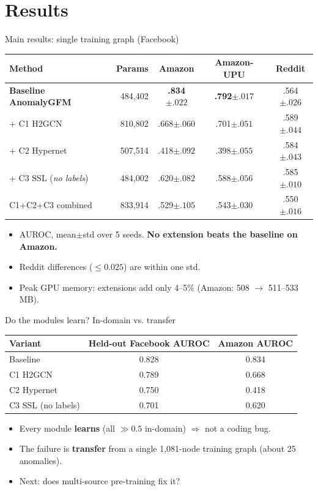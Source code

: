 \documentclass[aspectratio=169,11pt]{beamer}
\begin{document}
\section{Results}
\begin{frame}{Main results: single training graph (Facebook)}
\centering\small
\begin{tabular}{lrccc}
\toprule
Method & Params & Amazon & Amazon-UPU & Reddit\\ \midrule
\textbf{Baseline AnomalyGFM} & 484,402 & \textbf{.834}{\tiny$\pm.022$} & \textbf{.792}{\tiny$\pm.017$} & .564{\tiny$\pm.026$}\\
+ C1 H2GCN & 810,802 & .668{\tiny$\pm.060$} & .701{\tiny$\pm.051$} & .589{\tiny$\pm.044$}\\
+ C2 Hypernet & 507,514 & .418{\tiny$\pm.092$} & .398{\tiny$\pm.055$} & .584{\tiny$\pm.043$}\\
+ C3 SSL (\emph{no labels}) & 484,002 & .620{\tiny$\pm.082$} & .588{\tiny$\pm.056$} & .585{\tiny$\pm.010$}\\
C1+C2+C3 combined & 833,914 & .529{\tiny$\pm.105$} & .543{\tiny$\pm.030$} & .550{\tiny$\pm.016$}\\ \bottomrule
\end{tabular}
\vspace{6pt}
\begin{itemize}\small
\item AUROC, mean$\pm$std over 5 seeds. \textbf{No extension beats the baseline on Amazon.}
\item Reddit differences ($\le0.025$) are within one std.
\item Peak GPU memory: extensions add only 4--5\% (Amazon: 508 $\to$ 511--533 MB).
\end{itemize}
\end{frame}

\begin{frame}{Do the modules learn? In-domain vs. transfer}
\centering\small
\begin{tabular}{lcc}
\toprule
Variant & Held-out Facebook AUROC & Amazon AUROC\\ \midrule
Baseline & 0.828 & 0.834\\
C1 H2GCN & 0.789 & 0.668\\
C2 Hypernet & 0.750 & 0.418\\
C3 SSL (no labels) & 0.701 & 0.620\\ \bottomrule
\end{tabular}
\vspace{6pt}
\begin{itemize}
\item Every module \textbf{learns} (all $\gg0.5$ in-domain) $\Rightarrow$ not a coding bug.
\item The failure is \textbf{transfer} from a single 1,081-node training graph (about 25 anomalies).
\item Next: does \alert{multi-source} pre-training fix it?
\end{itemize}
\end{frame}
\end{document}
